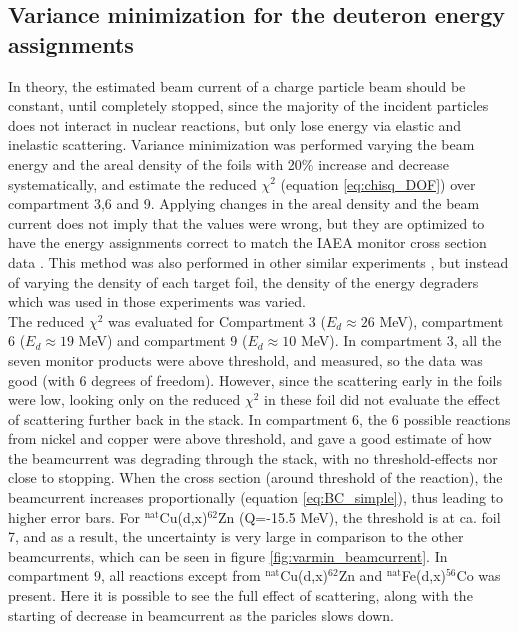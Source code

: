 \subsection{Variance minimization for the deuteron energy assignments}
In theory, the estimated beam current of a charge particle beam should be constant, until completely stopped, since the majority of the incident particles does not interact in nuclear reactions, but only lose energy via elastic and inelastic scattering. Variance minimization was performed varying the beam energy and the areal density of the foils with 20\% increase and decrease systematically, and estimate the reduced $\chi^2$ (equation \ref{eq:chisq_DOF}) over compartment 3,6 and 9. Applying changes in the areal density and the beam current does not imply that the values were wrong, but they are optimized to have the energy assignments correct to match the IAEA monitor cross section data \cite{Morrell2020}. This method was also performed in other similar experiments \cite{Graves2016, Voyles2018c, Voyles2019, Morell2020}, but instead of varying the density of each target foil, the density of the energy degraders which was used in those experiments was varied. \\ 

The reduced $\chi^2$ was evaluated for Compartment 3 ($E_d\approx 26 $ MeV), compartment 6 ($E_d \approx 19$ MeV) and compartment 9 ($E_d\approx 10$ MeV). In compartment 3, all the seven monitor products were above threshold, and measured, so the data was good (with 6 degrees of freedom). However, since the scattering early in the foils were low, looking only on the reduced $\chi^2$ in these foil did not evaluate the effect of scattering further back in the stack. In compartment 6, the 6 possible reactions from nickel and copper were above threshold, and gave a good estimate of how the beamcurrent was degrading through the stack, with no threshold-effects nor close to stopping. When the cross section (around threshold of the reaction), the beamcurrent increases proportionally (equation \ref{eq:BC_simple}), thus leading to higher error bars. For $^\text{nat}$Cu(d,x)$^{62}$Zn (Q=-15.5 MeV), the threshold is at ca. foil 7, and as a result, the uncertainty is very large in comparison to the other beamcurrents, which can be seen in figure \ref{fig:varmin_beamcurrent}. In compartment 9, all reactions except from $^\text{nat}$Cu(d,x)$^{62}$Zn and $^\text{nat}$Fe(d,x)$^{56}$Co was present. Here it is possible to see the full effect of scattering, along with the starting of decrease in beamcurrent as the paricles slows down. \\


